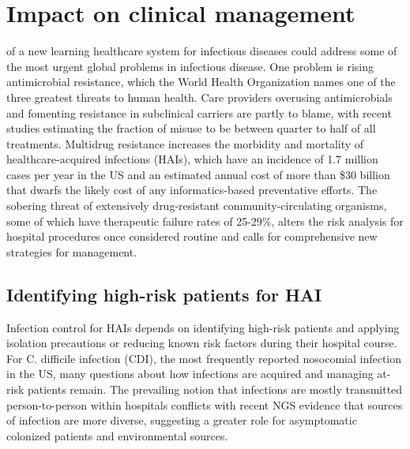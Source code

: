 \section{Impact on clinical management}

 of a new learning healthcare system for infectious diseases could address some of the most urgent global problems in infectious disease. One problem is rising antimicrobial resistance, which the World Health Organization names one of the three greatest threats to human health.\autocite{Policy2010} Care providers overusing antimicrobials and fomenting resistance in subclinical carriers are partly to blame, with recent studies estimating the fraction of misuse to be between quarter to half of all treatments.\autocite{McKellar2014} Multidrug resistance increases the morbidity and mortality of healthcare-acquired infections (HAIs), which have an incidence of 1.7 million cases per year in the US and an estimated annual cost of more than \$30 billion \autocite{Scott2009} that dwarfs the likely cost of any informatics-based preventative efforts. The sobering threat of extensively drug-resistant community-circulating organisms, some of which have therapeutic failure rates of 25-29\%,\autocite{Hirsch2010} alters the risk analysis for hospital procedures once considered routine and calls for comprehensive new strategies for management.

\subsection{Identifying high-risk patients for HAI}

Infection control for HAIs depends on identifying high-risk patients and applying isolation precautions or reducing known risk factors during their hospital course. For C. difficile infection (CDI), the most frequently reported nosocomial infection in the US, many questions about how infections are acquired and managing at-risk patients remain.\autocite{Leffler2015} The prevailing notion that infections are mostly transmitted person-to-person within hospitals \autocite{Cohen2010} conflicts with recent NGS evidence that sources of infection are more diverse,\autocite{Eyre2013} suggesting a greater role for asymptomatic colonized patients and environmental sources.

